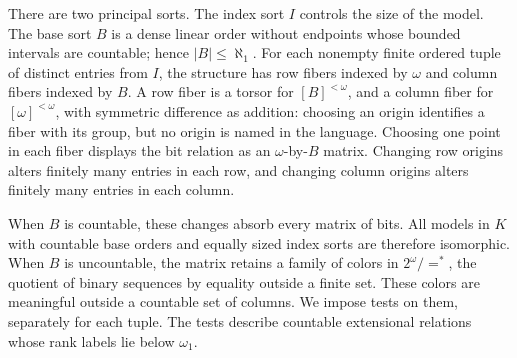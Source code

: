 There are two principal sorts. The index sort \(I\) controls the size
of the model. The base sort \(B\) is a dense linear order without
endpoints whose bounded intervals are countable; hence
\(|B|\le\aleph_1\). For each nonempty finite ordered tuple of distinct entries from \(I\),
the structure has row fibers indexed by \(\omega\) and column fibers
indexed by \(B\). A row fiber is a torsor for \([B]^{<\omega}\), and a
column fiber for \([\omega]^{<\omega}\), with symmetric difference as
addition: choosing an origin identifies a fiber with its group, but no
origin is named in the language. Choosing one point in each fiber displays
the bit relation as an \(\omega\)-by-\(B\) matrix. Changing row origins
alters finitely many entries in each row, and changing column origins
alters finitely many entries in each column.

When \(B\) is countable, these changes absorb every matrix of bits.
All models in \(K\) with countable base orders and equally sized
index sorts are therefore isomorphic. When \(B\) is uncountable,
the matrix retains a family of colors in \(2^\omega/=^*\), the quotient
of binary sequences by equality outside a finite set. These colors are
meaningful outside a countable set of columns. We impose tests on them,
separately for each tuple. The tests describe countable extensional
relations whose rank labels lie below \(\omega_1\).

